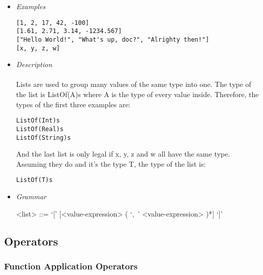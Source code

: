 \documentclass{article}
\begin{document}
\begin{itemize}

\item \textit{Examples}
\begin{verbatim}
[1, 2, 17, 42, -100]
[1.61, 2.71, 3.14, -1234.567]
["Hello World!", "What's up, doc?", "Alrighty then!"]
[x, y, z, w]
\end{verbatim}

\item \textit{Description} \\\\
Lists are used to group many values of the same type into one. 
The type of the list is ListOf(A)s where A is the type of every value inside.
Therefore, the types of the first three examples are:
\begin{verbatim}
ListOf(Int)s
ListOf(Real)s
ListOf(String)s
\end{verbatim}
And the last list is only legal if x, y, z and w all have the same type. Assuming 
they do and it's the type T, the type of the list is: 
\begin{verbatim}
ListOf(T)s
\end{verbatim}

\item \textit{Grammar}
\begin{grammar}
<list> ::= `[' [<value-expression> ( `,\ ' <value-expression> )*] `]'
\end{grammar}

\end{itemize}

\subsection{Operators}

\subsubsection{Function Application Operators}
\end{document}
